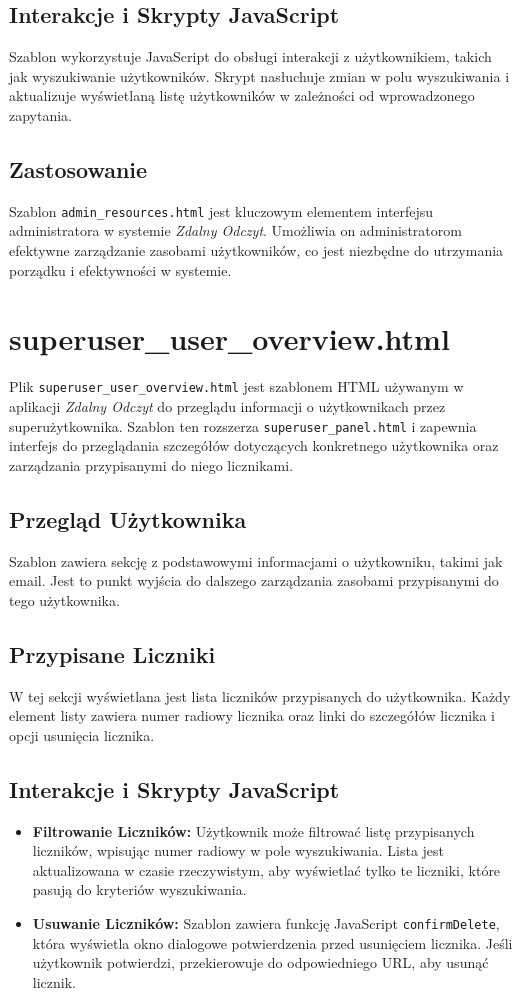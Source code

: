 \documentclass[12pt,a4paper]{report}
\begin{document}
\subsection{Interakcje i Skrypty JavaScript}
Szablon wykorzystuje JavaScript do obsługi interakcji z użytkownikiem, takich jak wyszukiwanie użytkowników. Skrypt nasłuchuje zmian w polu wyszukiwania i aktualizuje wyświetlaną listę użytkowników w zależności od wprowadzonego zapytania.

\subsection{Zastosowanie}
Szablon \texttt{admin\_resources.html} jest kluczowym elementem interfejsu administratora w systemie \textit{Zdalny Odczyt}. Umożliwia on administratorom efektywne zarządzanie zasobami użytkowników, co jest niezbędne do utrzymania porządku i efektywności w systemie.


\section{superuser\_user\_overview.html}
\label{sec:superuseruseroverview}
Plik \texttt{superuser\_user\_overview.html} jest szablonem HTML używanym w aplikacji \textit{Zdalny Odczyt} do przeglądu informacji o użytkownikach przez superużytkownika. Szablon ten rozszerza \texttt{superuser\_panel.html} i zapewnia interfejs do przeglądania szczegółów dotyczących konkretnego użytkownika oraz zarządzania przypisanymi do niego licznikami.

\subsection{Przegląd Użytkownika}
Szablon zawiera sekcję z podstawowymi informacjami o użytkowniku, takimi jak email. Jest to punkt wyjścia do dalszego zarządzania zasobami przypisanymi do tego użytkownika.

\subsection{Przypisane Liczniki}
W tej sekcji wyświetlana jest lista liczników przypisanych do użytkownika. Każdy element listy zawiera numer radiowy licznika oraz linki do szczegółów licznika i opcji usunięcia licznika.

\subsection{Interakcje i Skrypty JavaScript}
\begin{itemize}
\item \textbf{Filtrowanie Liczników:} Użytkownik może filtrować listę przypisanych liczników, wpisując numer radiowy w pole wyszukiwania. Lista jest aktualizowana w czasie rzeczywistym, aby wyświetlać tylko te liczniki, które pasują do kryteriów wyszukiwania.
\item \textbf{Usuwanie Liczników:} Szablon zawiera funkcję JavaScript \texttt{confirmDelete}, która wyświetla okno dialogowe potwierdzenia przed usunięciem licznika. Jeśli użytkownik potwierdzi, przekierowuje do odpowiedniego URL, aby usunąć licznik.
\end{itemize}
\end{document}
